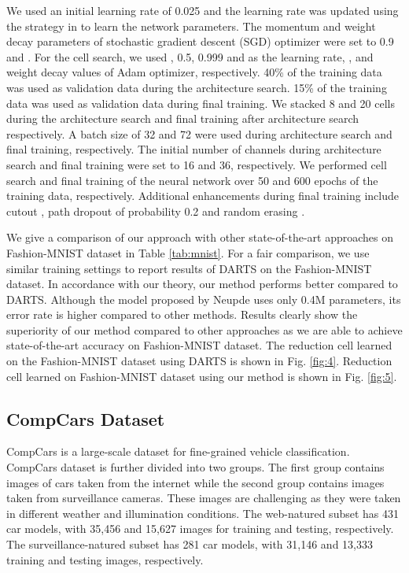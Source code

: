 \documentclass[10pt,a4paper,conference]{IEEEtran}
\begin{document}
We used an initial learning rate of 0.025 and the learning rate was updated using the strategy in \cite{Loshchilov2017SGDRSG:22} to learn the network parameters. The momentum and weight decay parameters of stochastic gradient descent (SGD) optimizer were set to 0.9 and . For the cell search, we used , 0.5, 0.999 and  as the learning rate, ,  and weight decay values of Adam optimizer, respectively. 40\% of the training data was used as validation data during the architecture search. 15\% of the training data was used as validation data during final training. We stacked 8 and 20 cells during the architecture search and final training after architecture search respectively. A batch size of 32 and 72 were used during architecture search and final training, respectively. The initial number of channels during architecture search and final training were set to 16 and 36, respectively. We performed cell search and final training of the neural network over 50 and 600 epochs of the training data, respectively. Additional enhancements during final training include cutout \cite{devries2017improved:24}, path dropout of probability 0.2 and random erasing \cite{zhong2017random:27}.

We give a comparison of our approach with other state-of-the-art approaches on Fashion-MNIST dataset in Table \ref{tab:mnist}.
For a fair comparison, we use similar training settings to report results of DARTS on the Fashion-MNIST dataset. In accordance with our theory, our method performs better compared to DARTS.
Although the model proposed by Neupde \cite{sun2019neupde:32} uses only 0.4M parameters, its error rate is higher compared to other methods. Results clearly show the superiority of our method compared to other approaches as we are able to achieve state-of-the-art accuracy on Fashion-MNIST dataset. The reduction cell learned on the Fashion-MNIST dataset using DARTS \cite{liu2018darts:6} is shown in Fig. \ref{fig:4}. Reduction cell learned on Fashion-MNIST dataset using our method is shown in Fig. \ref{fig:5}. 

\subsection{CompCars Dataset}
\noindent CompCars \cite{DBLP:journals/corr/YangLLT15:3} is a large-scale dataset for fine-grained vehicle classification. CompCars dataset is further divided into two groups. The first group contains images of cars taken from the internet while the second group contains images taken from surveillance cameras. These images are challenging as they were taken in different weather and illumination conditions. The web-natured subset has 431 car models, with 35,456 and 15,627 images for training and testing, respectively. The surveillance-natured subset has 281 car models, with 31,146 and 13,333 training and testing images, respectively. 
\end{document}
